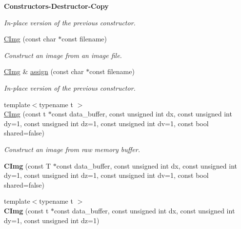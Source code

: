 \begin{Indent}{\bf Constructors-\/Destructor-\/Copy}
\begin{DoxyCompactItemize}
\begin{DoxyCompactList}\small\item\em In-\/place version of the previous constructor. \item\end{DoxyCompactList}\item 
\hyperlink{structcimg__library_1_1_c_img_a9a6e32d682055c3e357e8bddbb18916b}{CImg} (const char $\ast$const filename)
\begin{DoxyCompactList}\small\item\em Construct an image from an image file. \item\end{DoxyCompactList}\item 
\hyperlink{structcimg__library_1_1_c_img}{CImg} \& \hyperlink{structcimg__library_1_1_c_img_a791ec7a0e62b46d077a0c2fca1cd59f3}{assign} (const char $\ast$const filename)
\begin{DoxyCompactList}\small\item\em In-\/place version of the previous constructor. \item\end{DoxyCompactList}\item 
{\footnotesize template$<$typename t $>$ }\\\hyperlink{structcimg__library_1_1_c_img_a2795d889315351d99ce61094a1508266}{CImg} (const t $\ast$const data\_\-buffer, const unsigned int dx, const unsigned int dy=1, const unsigned int dz=1, const unsigned int dv=1, const bool shared=false)
\begin{DoxyCompactList}\small\item\em Construct an image from raw memory buffer. \item\end{DoxyCompactList}\item 
\hypertarget{structcimg__library_1_1_c_img_a9dadc23916e0d8b3099f9681d9dbbac0}{
{\bfseries CImg} (const T $\ast$const data\_\-buffer, const unsigned int dx, const unsigned int dy=1, const unsigned int dz=1, const unsigned int dv=1, const bool shared=false)}
\label{structcimg__library_1_1_c_img_a9dadc23916e0d8b3099f9681d9dbbac0}

\item 
\hypertarget{structcimg__library_1_1_c_img_ae43a90622439af40cfd533fadf8b891c}{
{\footnotesize template$<$typename t $>$ }\\{\bfseries CImg} (const t $\ast$const data\_\-buffer, const unsigned int dx, const unsigned int dy=1, const unsigned int dz=1)}
\label{structcimg__library_1_1_c_img_ae43a90622439af40cfd533fadf8b891c}


\end{DoxyCompactItemize}
\end{Indent}
